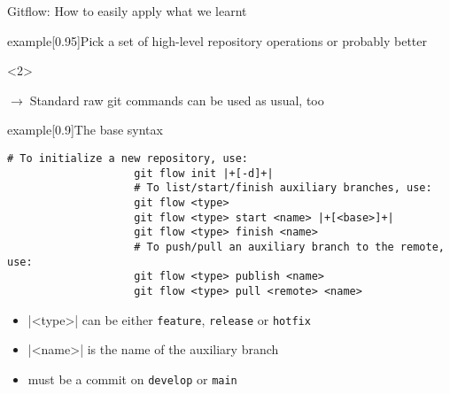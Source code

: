 \documentclass[usenames,svgnames,14pt]{beamer}
\begin{document}
\begin{frame}[fragile,c]{Gitflow: How to easily apply what we learnt}
    \vspace{-16mm}
    \begin{overlayarea}{\textwidth}{0.7\textheight}
        \begin{varblock}{example}[0.95\textwidth]{Pick a set of high-level repository operations}
            \quad or probably better \quad
        \end{varblock}
        \begin{onlyenv}<2>
            \vspace{-3mm}
            \centerline{\scriptsize \hspace{42mm}$\to\;$Standard raw git commands can be used as usual, too}
            \vspace{-6mm}
            \begin{varblock}{example}[0.9\textwidth]{The base syntax}
                \begin{lstlisting}[style=MyBash, aboveskip=2mm]
                    # To initialize a new repository, use:
                    git flow init |+[-d]+|
                    # To list/start/finish auxiliary branches, use:
                    git flow <type>
                    git flow <type> start <name> |+[<base>]+|
                    git flow <type> finish <name>
                    # To push/pull an auxiliary branch to the remote, use:
                    git flow <type> publish <name>
                    git flow <type> pull <remote> <name>
                \end{lstlisting}
                \begin{itemize}
                    \footnotesize\setlength{\itemsep}{0mm}
                    \item[] \bash|<type>|\; can be either \;\texttt{feature}, \;\texttt{release}\; or \;\texttt{hotfix}\\
                    \item[] \bash|<name>|\; is the name of the auxiliary branch\\
                    \item[] \; must be a commit on \;\texttt{develop}\; or \;\texttt{main}
                \end{itemize}
            \end{varblock}

\end{onlyenv}
\end{overlayarea}
\end{frame}
\end{document}
